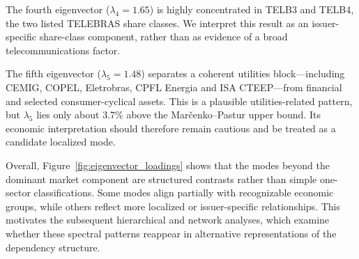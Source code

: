 The fourth eigenvector ($\lambda_4=1.65$) is highly concentrated in TELB3 and TELB4, the two listed TELEBRAS share classes. We interpret this result as an issuer-specific share-class component, rather than as evidence of a broad telecommunications factor. 

The fifth eigenvector ($\lambda_5=1.48$) separates a coherent utilities block---including CEMIG, COPEL, Eletrobras, CPFL Energia and ISA CTEEP---from financial and selected consumer-cyclical assets. This is a plausible utilities-related pattern, but $\lambda_5$ lies only about 3.7\% above the Mar\v{c}enko--Pastur upper bound. Its economic interpretation should therefore remain cautious and be treated as a candidate localized mode.

Overall, Figure~\ref{fig:eigenvector_loadings} shows that the modes beyond the dominant market component are structured contrasts rather than simple one-sector classifications. Some modes align partially with recognizable economic groups, while others reflect more localized or issuer-specific relationships. This motivates the subsequent hierarchical and network analyses, which examine whether these spectral patterns reappear in alternative representations of the dependency structure.
